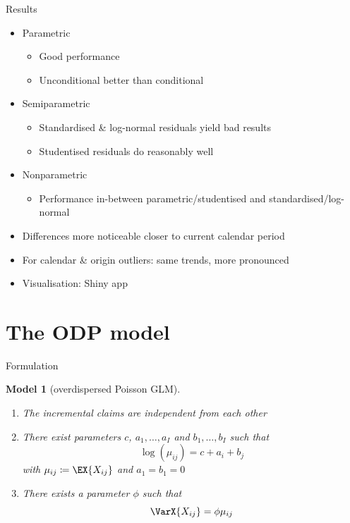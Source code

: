 \documentclass[tikz]{beamer}
\newtheorem{model}{Model}
\begin{document}
\begin{frame}{Results}
  \begin{itemize}
    \item Parametric
          \begin{itemize}
            \item Good performance
            \item Unconditional better than conditional
          \end{itemize}
    \item Semiparametric
          \begin{itemize}
            \item Standardised \& log-normal residuals yield bad results
            \item Studentised residuals do reasonably well
          \end{itemize}
    \item Nonparametric
          \begin{itemize}
            \item Performance in-between parametric/studentised and standardised/log-normal
          \end{itemize}
    \item Differences more noticeable closer to current calendar period
    \item For calendar \& origin outliers: same trends, more pronounced
    \item Visualisation: Shiny app
  \end{itemize}
\end{frame}

\section{The ODP model}

\begin{frame}{Formulation}
  \begin{model}[overdispersed Poisson GLM]
    \begin{enumerate}
      \item The incremental claims are independent from each other
      \item There exist parameters $c$, $a_1, \dots, a_I$ and $b_1, \dots, b_I$ such that
            \begin{equation*}
              \log(\mu_{ij}) = c + a_i + b_j
            \end{equation*}
            with $\mu_{ij} \coloneqq \EX{X_{ij}}$ and $a_1 = b_1 = 0$
      \item There exists a parameter $\phi$ such that
            \begin{equation*}
              \VarX{X_{ij}} = \phi \mu_{ij}
            \end{equation*}
    \end{enumerate}
  \end{model}
\end{frame}
\end{document}
